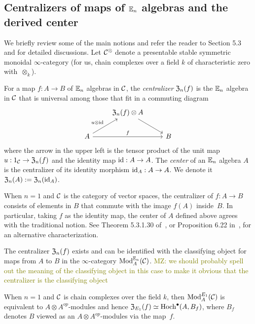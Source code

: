 \documentclass[11pt]{amsart}
\numberwithin{equation}{section}
\def\mahmoud{\textcolor{olive}{MZ: }\textcolor{olive}}
\begin{document}
\subsection{Centralizers of maps of $\mathbb E_n$ algebras and the derived center}
\label{sec: centralizer}

We briefly review some of the main notions and refer the reader to \cite{LurieHA} Section 5.3 and \cite{FrancisHH} for detailed discussions. Let $\mathcal C^\otimes$ denote a presentable stable symmetric monoidal $\infty$-category (for us, chain complexes over a field $k$ of characteristic zero with~$\otimes_k$).

\begin{dfn}
\label{D:centralizer}
For a map $f: A \to B$ of $\mathbb E_n$ algebras in $\mathcal C$, 
the {\em centralizer} ${\frak Z}_n(f)$ is the $\mathbb E_n$ algebra in $\mathcal C$ that is universal among those that fit in a commuting diagram
\[
\begin{tikzcd}
& {\frak Z}_n(f) \otimes A \arrow[dr] & \\
A \arrow[ur, "u \otimes \id"] \arrow[rr, "f"] && B
\end{tikzcd}
\]
where the arrow in the upper left is the tensor product of the unit map $u: 1_\mathcal C \to {\frak Z}_n(f)$ and the identity map ${\rm id}: A \to A$.
The {\em center} of an $\mathbb E_n$ algebra $A$ is the centralizer of its identity morphism ${\rm id}_A: A \to A$. 
We  denote it ${\frak Z}_n(A) := {\frak Z}_n({\rm id}_A)$.
\end{dfn}

When $n=1$ and $\mathcal C$ is the category of vector spaces, 
the centralizer of $f: A \to B$ consists of elements in $B$ that commute with the image $f(A)$ inside~$B$. 
In particular, taking $f$ as the identity map, 
the center of $A$ defined above agrees with the traditional notion. 
See Theorem 5.3.1.30 of~\cite{LurieHA}, or Proposition 6.22 in~\cite{GTZ3}, for an alternative characterization.

\begin{prp}
\label{T:centralizer=inthom} 
The centralizer ${\frak Z}_n(f)$ exists and can be identified with the classifying object for maps from $A$ to $B$ in the $\infty$-category ${\rm Mod}^{\mathbb E_n}_A(\mathcal C)$. \mahmoud{we should probably spell out the meaning of the classifying object in this case to make it obvious that the centralizer is the classifying object}
\end{prp} 

When $n=1$ and $\mathcal C$ is chain complexes over the field $k$, then ${\rm Mod}^{E_1}_A(\mathcal C)$ is equivalent to $A\otimes A^{op}$-modules and hence ${\frak Z}_{E_1}(f) \simeq {\rm Hoch}^\bullet(A,B_f)$,
where $B_f$ denotes $B$ viewed as an $A\otimes A^{op}$-modules via the map~$f$.
\end{document}
